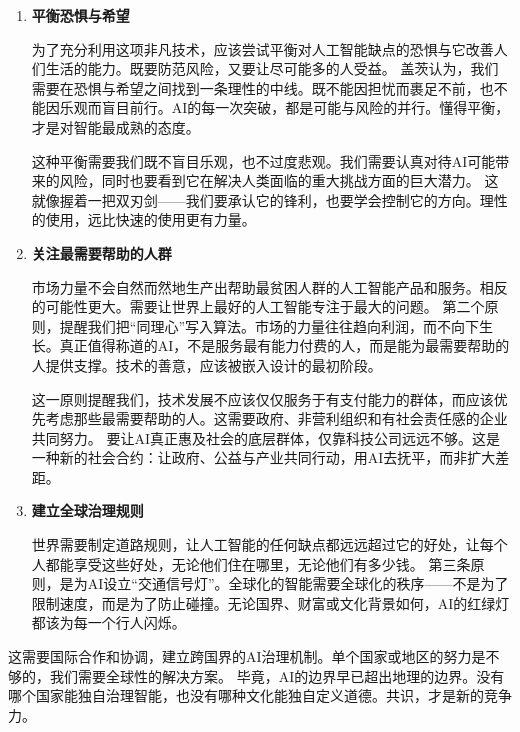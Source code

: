 \begin{enumerate}
\item {\bf 平衡恐惧与希望}

为了充分利用这项非凡技术，应该尝试平衡对人工智能缺点的恐惧与它改善人们生活的能力。既要防范风险，又要让尽可能多的人受益。
盖茨认为，我们需要在恐惧与希望之间找到一条理性的中线。既不能因担忧而裹足不前，也不能因乐观而盲目前行。AI的每一次突破，都是可能与风险的并行。懂得平衡，才是对智能最成熟的态度。

这种平衡需要我们既不盲目乐观，也不过度悲观。我们需要认真对待AI可能带来的风险，同时也要看到它在解决人类面临的重大挑战方面的巨大潜力。
这就像握着一把双刃剑——我们要承认它的锋利，也要学会控制它的方向。理性的使用，远比快速的使用更有力量。

\item {\bf 关注最需要帮助的人群}

市场力量不会自然而然地生产出帮助最贫困人群的人工智能产品和服务。相反的可能性更大。需要让世界上最好的人工智能专注于最大的问题。
第二个原则，提醒我们把“同理心”写入算法。市场的力量往往趋向利润，而不向下生长。真正值得称道的AI，不是服务最有能力付费的人，而是能为最需要帮助的人提供支撑。技术的善意，应该被嵌入设计的最初阶段。

这一原则提醒我们，技术发展不应该仅仅服务于有支付能力的群体，而应该优先考虑那些最需要帮助的人。这需要政府、非营利组织和有社会责任感的企业共同努力。
要让AI真正惠及社会的底层群体，仅靠科技公司远远不够。这是一种新的社会合约：让政府、公益与产业共同行动，用AI去抚平，而非扩大差距。

\item {\bf 建立全球治理规则}

世界需要制定道路规则，让人工智能的任何缺点都远远超过它的好处，让每个人都能享受这些好处，无论他们住在哪里，无论他们有多少钱。
第三条原则，是为AI设立“交通信号灯”。全球化的智能需要全球化的秩序——不是为了限制速度，而是为了防止碰撞。无论国界、财富或文化背景如何，AI的红绿灯都该为每一个行人闪烁。
\end{enumerate}

这需要国际合作和协调，建立跨国界的AI治理机制。单个国家或地区的努力是不够的，我们需要全球性的解决方案。
毕竟，AI的边界早已超出地理的边界。没有哪个国家能独自治理智能，也没有哪种文化能独自定义道德。共识，才是新的竞争力。

